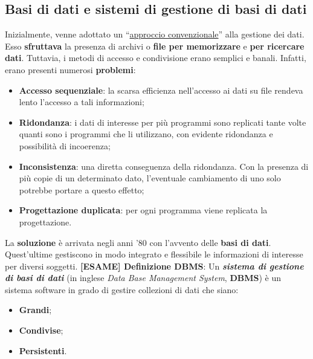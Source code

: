 \documentclass[a4paper]{article}
\newcommand{\dquotes}[1]{``#1''}
\begin{document}
	\newpage
	
	
	
	\subsection{Basi di dati e sistemi di gestione di basi di dati}
	
	Inizialmente, venne adottato un \dquotes{\underline{approccio convenzionale}} alla gestione dei dati. Esso \textbf{sfruttava} la presenza di archivi o \textbf{file per memorizzare} e \textbf{per ricercare dati}. Tuttavia, i metodi di accesso e condivisione erano semplici e banali.\newline
	Infatti, erano presenti numerosi \textbf{problemi}:
	
	\begin{itemize}
		\item[\ding{56}] \textbf{Accesso sequenziale}: la scarsa efficienza nell'accesso ai dati su file rendeva lento l'accesso a tali informazioni;
		\item[\ding{56}] \textbf{Ridondanza}: i dati di interesse per più programmi sono replicati tante volte quanti sono i programmi che li utilizzano, con evidente ridondanza e possibilità di incoerenza;
		\item[\ding{56}] \textbf{Inconsistenza}: una diretta conseguenza della ridondanza. Con la presenza di più copie di un determinato dato, l'eventuale cambiamento di uno solo potrebbe portare a questo effetto;
		\item[\ding{56}] \textbf{Progettazione duplicata}: per ogni programma viene replicata la progettazione.
	\end{itemize}
	
	\noindent
	La \textbf{soluzione} è arrivata negli anni '80 con l'avvento delle \textbf{basi di dati}. Quest'ultime gestiscono in modo integrato e flessibile le informazioni di interesse per diversi soggetti.\newline
	\newline \noindent	
	\textcolor{Red3}{\textbf{[ESAME] Definizione DBMS}}: Un \textbf{\emph{sistema di gestione di basi di dati}} (in inglese \emph{Data Base Management System}, \textbf{DBMS}) è un sistema software in grado di gestire collezioni di dati che siano:
	
	\begin{itemize}
		\item[\ding{52}] \textbf{Grandi};
		\item[\ding{52}] \textbf{Condivise};
		\item[\ding{52}] \textbf{Persistenti}.
	\end{itemize}
	
\end{document}
